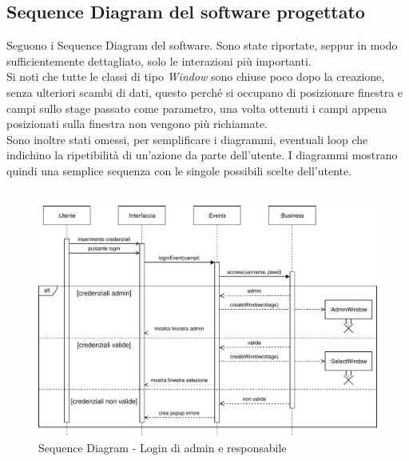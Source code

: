 \documentclass[a4paper,11pt]{article}
\begin{document}
\newpage

\subsection{Sequence Diagram del software progettato}

Seguono i Sequence Diagram del software. Sono state riportate, seppur in modo sufficientemente dettagliato, solo le interazioni più importanti.\\
Si noti che tutte le classi di tipo \emph{Window} sono chiuse poco dopo la creazione, senza ulteriori scambi di dati, questo perché si occupano di posizionare finestra e campi sullo stage passato come parametro, una volta ottenuti i campi appena posizionati sulla finestra non vengono più richiamate.\\
Sono inoltre stati omessi, per semplificare i diagrammi, eventuali loop che indichino la ripetibilità di un'azione da parte dell'utente. I diagrammi mostrano quindi una semplice sequenza con le singole possibili scelte dell'utente.\\
\\

\begin{figure}[htpb]
	\centering
	\hspace*{-2cm}
	\includegraphics[width=1.3\textwidth]{diagrams/Sequence_Diagram_-_Login.pdf}
	\caption{Sequence Diagram - Login di admin e responsabile}
	\label{fig:sqc_dia_log}
\end{figure}
\end{document}
